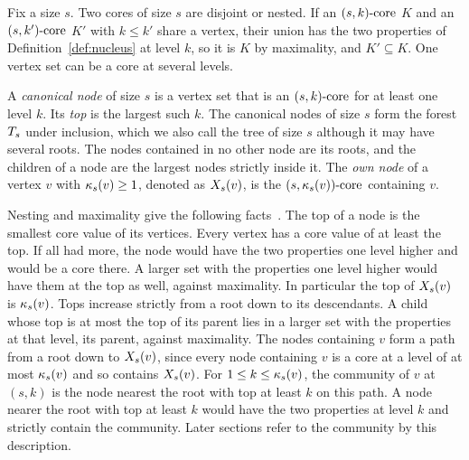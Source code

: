 Fix a size $s$.
%
Two cores of size $s$ are disjoint or nested.
%
If an $(s,k)\text{-core}$ $K$ and an $(s,k')\text{-core}$ $K'$ with $k\le k'$ share a vertex, their union has the two properties of Definition~\ref{def:nucleus} at level $k$, so it is $K$ by maximality, and $K'\subseteq K$.
%
One vertex set can be a core at several levels.
\begin{definition}\label{def:node}
A \textit{canonical node} of size $s$ is a vertex set that is an $(s,k)\text{-core}$ for at least one level $k$.
%
Its \textit{top} is the largest such $k$.
%
The canonical nodes of size $s$ form the forest $T_{s}$ under inclusion, which we also call the tree of size $s$ although it may have several roots.
%
The nodes contained in no other node are its roots, and the children of a node are the largest nodes strictly inside it.
%
The \textit{own node} of a vertex $v$ with $\kappa_{s}(v)\ge1$, denoted as $X_{s}(v)$, is the $(s,\kappa_{s}(v))\text{-core}$ containing $v$.
\end{definition}
Nesting and maximality give the following facts~\cite{firstNucleus}.
%
The top of a node is the smallest core value of its vertices.
%
Every vertex has a core value of at least the top.
%
If all had more, the node would have the two properties one level higher and would be a core there.
%
A larger set with the properties one level higher would have them at the top as well, against maximality.
%
In particular the top of $X_{s}(v)$ is $\kappa_{s}(v)$.
%
Tops increase strictly from a root down to its descendants.
%
A child whose top is at most the top of its parent lies in a larger set with the properties at that level, its parent, against maximality.
%
The nodes containing $v$ form a path from a root down to $X_{s}(v)$, since every node containing $v$ is a core at a level of at most $\kappa_{s}(v)$ and so contains $X_{s}(v)$.
%
For $1\le k\le\kappa_{s}(v)$, the community of $v$ at $(s,k)$ is the node nearest the root with top at least $k$ on this path.
%
A node nearer the root with top at least $k$ would have the two properties at level $k$ and strictly contain the community.
%
Later sections refer to the community by this description.
